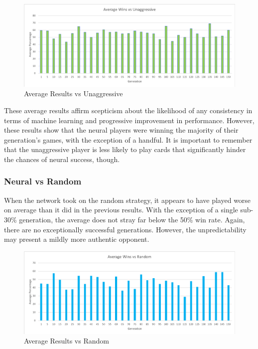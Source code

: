 \documentclass[12pt,a4paper]{article}
\begin{document}
\begin{figure}[h]
	\centering
	\includegraphics[width = \textwidth]{Una1.png}
	\caption{Average Results vs Unaggressive}
\end{figure}

\newpage
These average results affirm scepticism about the likelihood of any consistency in terms of machine learning and progressive improvement in performance. However, these results show that the neural players were winning the majority of their generation's games, with the exception of a handful. It is important to remember that the unaggressive player is less likely to play cards that significantly hinder the chances of neural success, though.

\subsubsection{Neural vs Random}
When the network took on the random strategy, it appears to have played worse on average than it did in the previous results. With the exception of a single sub-30\% generation, the average does not stray far below the 50\% win rate. Again, there are no exceptionally successful generations. However, the unpredictability may present a mildly more authentic opponent.

\begin{figure}[h]
	\centering
	\includegraphics[width = \textwidth]{Rand1.png}
	\caption{Average Results vs Random}
\end{figure}
\end{document}
